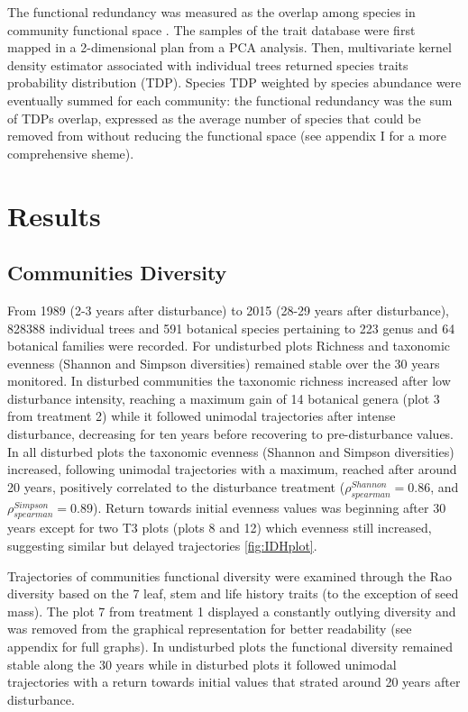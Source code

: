 \documentclass[fleqn,10pt]{ArtEcoFoG} %
\theoremstyle{definition}
\theoremstyle{definition}
\theoremstyle{definition}
\theoremstyle{remark}
\begin{document}
The functional redundancy was measured as the overlap among species in
community functional space \citep{Carmona2016}. The samples of the trait
database were first mapped in a 2-dimensional plan from a PCA analysis.
Then, multivariate kernel density estimator associated with individual
trees returned species traits probability distribution (TDP). Species
TDP weighted by species abundance were eventually summed for each
community: the functional redundancy was the sum of TDPs overlap,
expressed as the average number of species that could be removed from
without reducing the functional space (see appendix I for a more
comprehensive sheme).

\section{Results}\label{results}

\subsection{Communities Diversity}\label{communities-diversity}

From 1989 (2-3 years after disturbance) to 2015 (28-29 years after
disturbance), 828388 individual trees and 591 botanical species
pertaining to 223 genus and 64 botanical families were recorded. For
undisturbed plots Richness and taxonomic evenness (Shannon and Simpson
diversities) remained stable over the 30 years monitored. In disturbed
communities the taxonomic richness increased after low disturbance
intensity, reaching a maximum gain of 14 botanical genera (plot 3 from
treatment 2) while it followed unimodal trajectories after intense
disturbance, decreasing for ten years before recovering to
pre-disturbance values. In all disturbed plots the taxonomic evenness
(Shannon and Simpson diversities) increased, following unimodal
trajectories with a maximum, reached after around 20 years, positively
correlated to the disturbance treatment
(\(\rho_{spearman}^{Shannon}=0.86\), and
\(\rho_{spearman}^{Simpson}=0.89\)). Return towards initial evenness
values was beginning after 30 years except for two T3 plots (plots 8 and
12) which evenness still increased, suggesting similar but delayed
trajectories \ref{fig:IDHplot}.

Trajectories of communities functional diversity were examined through
the Rao diversity based on the 7 leaf, stem and life history traits (to
the exception of seed mass). The plot 7 from treatment 1 displayed a
constantly outlying diversity and was removed from the graphical
representation for better readability (see appendix for full graphs). In
undisturbed plots the functional diversity remained stable along the 30
years while in disturbed plots it followed unimodal trajectories with a
return towards initial values that strated around 20 years after
disturbance.
\end{document}

